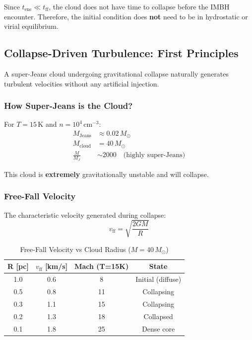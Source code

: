 \documentclass[11pt,a4paper]{article}
\newcommand{\Msun}{M_\odot}
\newcommand{\cmcubed}{\,\mathrm{cm^{-3}}}
\begin{document}
Since $t_\mathrm{enc} \ll t_\mathrm{ff}$, the cloud does not have time to collapse
before the IMBH encounter. Therefore, the initial condition does \textbf{not} need
to be in hydrostatic or virial equilibrium.

\subsection{Collapse-Driven Turbulence: First Principles}

A super-Jeans cloud undergoing gravitational collapse naturally generates
turbulent velocities without any artificial injection.

\subsubsection{How Super-Jeans is the Cloud?}

For $T = 15\,\mathrm{K}$ and $n = 10^4\cmcubed$:
\begin{align}
    M_\mathrm{Jeans} &\approx 0.02\,\Msun \\
    M_\mathrm{cloud} &= 40\,\Msun \\
    \frac{M}{M_J} &\sim 2000 \quad \text{(highly super-Jeans)}
\end{align}

This cloud is \textbf{extremely} gravitationally unstable and will collapse.

\subsubsection{Free-Fall Velocity}

The characteristic velocity generated during collapse:
\begin{equation}
    v_\mathrm{ff} = \sqrt{\frac{2 G M}{R}}
\end{equation}

\begin{table}[h]
\centering
\caption{Free-Fall Velocity vs Cloud Radius ($M = 40\,\Msun$)}
\begin{tabular}{cccc}
\toprule
\textbf{R [pc]} & \textbf{$v_\mathrm{ff}$ [km/s]} & \textbf{Mach (T=15K)} & \textbf{State} \\
\midrule
1.0 & 0.6 & 8 & Initial (diffuse) \\
0.5 & 0.8 & 11 & Collapsing \\
0.3 & 1.1 & 15 & Collapsing \\
0.2 & 1.3 & 18 & Collapsed \\
0.1 & 1.8 & 25 & Dense core \\
\bottomrule
\end{tabular}
\end{table}
\end{document}
